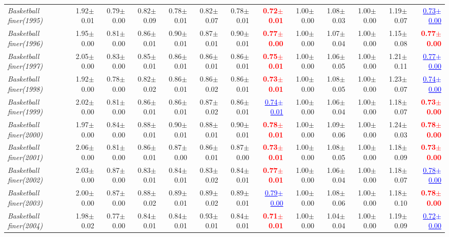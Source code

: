 \documentclass[nohyperref]{article}
\theoremstyle{plain}
\theoremstyle{definition}
\theoremstyle{remark}
\newcommand{\red}[1]{\textcolor{red}{\textbf{#1}}}
\newcommand{\blue}[1]{\textcolor{blue}{\underline{#1}}}
\begin{document}
\begin{table*}[!ht]
{\begin{tabular}{lrr|rrrrr|rrrrr}
			{\it Basketball finer(1995)} & 1.92$\pm$0.01 & 0.79$\pm$0.00 & 0.82$\pm$0.09 & 0.78$\pm$0.01 & 0.82$\pm$0.07 & 0.78$\pm$0.01 & \red{0.72$\pm$0.01} & 1.00$\pm$0.00 & 1.08$\pm$0.03 & 1.00$\pm$0.00 & 1.19$\pm$0.07 & \blue{0.73$\pm$0.00} \\
			{\it Basketball finer(1996)} & 1.95$\pm$0.00 & 0.81$\pm$0.00 & 0.86$\pm$0.01 & 0.90$\pm$0.01 & 0.87$\pm$0.01 & 0.90$\pm$0.01 & \red{0.77$\pm$0.00} & 1.00$\pm$0.00 & 1.07$\pm$0.04 & 1.00$\pm$0.00 & 1.15$\pm$0.08 & \red{0.77$\pm$0.00} \\
			{\it Basketball finer(1997)} & 2.05$\pm$0.00 & 0.83$\pm$0.00 & 0.85$\pm$0.01 & 0.86$\pm$0.01 & 0.86$\pm$0.01 & 0.86$\pm$0.01 & \red{0.75$\pm$0.01} & 1.00$\pm$0.00 & 1.06$\pm$0.05 & 1.00$\pm$0.00 & 1.21$\pm$0.11 & \blue{0.77$\pm$0.00} \\
			{\it Basketball finer(1998)} & 1.92$\pm$0.00 & 0.78$\pm$0.00 & 0.82$\pm$0.02 & 0.86$\pm$0.01 & 0.86$\pm$0.02 & 0.86$\pm$0.01 & \red{0.73$\pm$0.01} & 1.00$\pm$0.00 & 1.08$\pm$0.05 & 1.00$\pm$0.00 & 1.23$\pm$0.07 & \blue{0.74$\pm$0.00} \\
			{\it Basketball finer(1999)} & 2.02$\pm$0.00 & 0.81$\pm$0.00 & 0.86$\pm$0.01 & 0.86$\pm$0.01 & 0.87$\pm$0.02 & 0.86$\pm$0.01 & \blue{0.74$\pm$0.01} & 1.00$\pm$0.00 & 1.06$\pm$0.04 & 1.00$\pm$0.00 & 1.18$\pm$0.07 & \red{0.73$\pm$0.00} \\
			{\it Basketball finer(2000)} & 1.97$\pm$0.00 & 0.84$\pm$0.00 & 0.88$\pm$0.01 & 0.90$\pm$0.01 & 0.88$\pm$0.01 & 0.90$\pm$0.01 & \red{0.78$\pm$0.01} & 1.00$\pm$0.00 & 1.09$\pm$0.06 & 1.00$\pm$0.00 & 1.24$\pm$0.03 & \red{0.78$\pm$0.00} \\
			{\it Basketball finer(2001)} & 2.06$\pm$0.00 & 0.81$\pm$0.00 & 0.86$\pm$0.01 & 0.87$\pm$0.00 & 0.86$\pm$0.01 & 0.87$\pm$0.00 & \red{0.73$\pm$0.01} & 1.00$\pm$0.00 & 1.08$\pm$0.05 & 1.00$\pm$0.00 & 1.18$\pm$0.09 & \red{0.73$\pm$0.00} \\
			{\it Basketball finer(2002)} & 2.03$\pm$0.00 & 0.87$\pm$0.00 & 0.83$\pm$0.01 & 0.84$\pm$0.01 & 0.83$\pm$0.02 & 0.84$\pm$0.01 & \red{0.77$\pm$0.01} & 1.00$\pm$0.00 & 1.06$\pm$0.04 & 1.00$\pm$0.00 & 1.18$\pm$0.07 & \blue{0.78$\pm$0.00} \\
			{\it Basketball finer(2003)} & 2.00$\pm$0.00 & 0.87$\pm$0.00 & 0.88$\pm$0.02 & 0.89$\pm$0.01 & 0.89$\pm$0.02 & 0.89$\pm$0.01 & \blue{0.79$\pm$0.00} & 1.00$\pm$0.00 & 1.08$\pm$0.06 & 1.00$\pm$0.00 & 1.18$\pm$0.10 & \red{0.78$\pm$0.00} \\
			{\it Basketball finer(2004)} & 1.98$\pm$0.02 & 0.77$\pm$0.00 & 0.84$\pm$0.01 & 0.84$\pm$0.01 & 0.93$\pm$0.01 & 0.84$\pm$0.01 & \red{0.71$\pm$0.01} & 1.00$\pm$0.00 & 1.04$\pm$0.04 & 1.00$\pm$0.00 & 1.19$\pm$0.09 & \blue{0.72$\pm$0.00} \\

\end{tabular}}
\end{table*}
\end{document}

